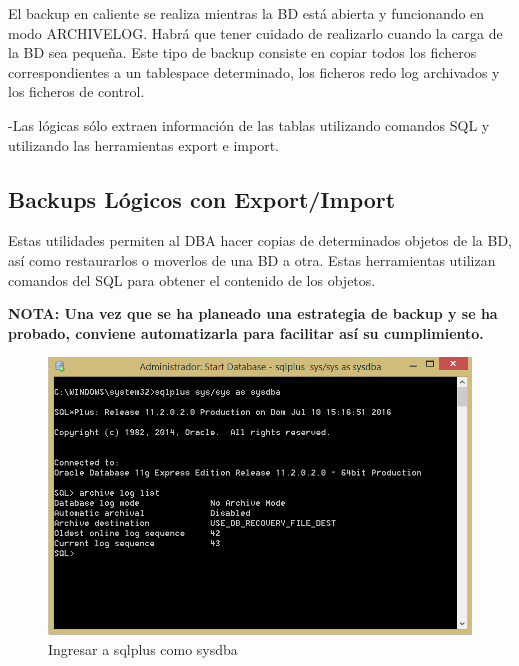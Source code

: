 El backup en caliente se realiza mientras la BD está abierta y funcionando en modo ARCHIVELOG. Habrá que tener cuidado de realizarlo cuando la carga de la BD sea pequeña. Este tipo de backup consiste en copiar todos los ficheros correspondientes a un tablespace determinado, los ficheros redo log archivados y los ficheros de control.

-Las lógicas sólo extraen información de las tablas utilizando comandos SQL y utilizando las herramientas export e import.

\subsection{Backups Lógicos con Export/Import}

Estas utilidades permiten al DBA hacer copias de determinados objetos de la BD, así como restaurarlos o moverlos de una BD a otra. Estas herramientas utilizan comandos del SQL para obtener el contenido de los objetos.

\textbf{NOTA: Una vez que se ha planeado una estrategia de backup y se ha probado, conviene automatizarla para facilitar así su cumplimiento.}

\begin{figure}[h]
\centering
\includegraphics[scale=1.7]{../images/ingresarsqlplus.png}
\caption{Ingresar a sqlplus como sysdba}
\label{fig:ingresar}
\end{figure}

